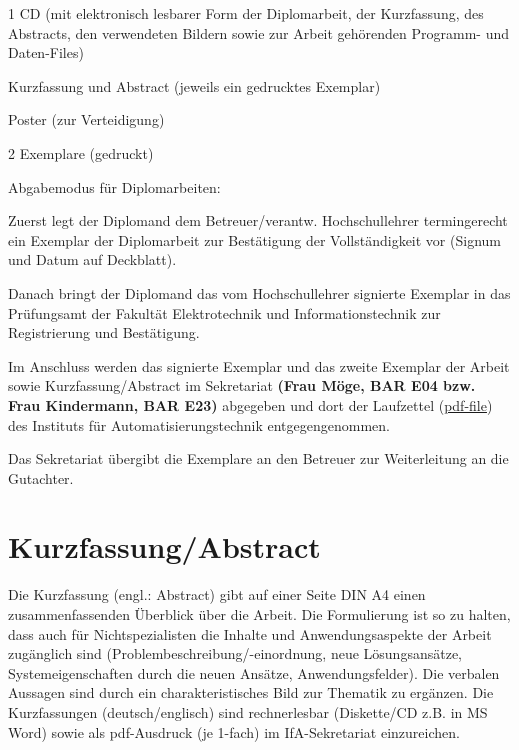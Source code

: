 \begin{compactitem}
  \item 1 CD (mit elektronisch lesbarer Form der Diplomarbeit, der Kurzfassung, des Abstracts, den verwendeten Bildern sowie zur Arbeit gehörenden Programm- und Daten-Files)
  \item Kurzfassung und Abstract (jeweils ein gedrucktes Exemplar)
  \item Poster (zur Verteidigung)
  \item 2 Exemplare (gedruckt)
  \item Abgabemodus für Diplomarbeiten:
    \begin{compactitem}
      \item Zuerst legt der Diplomand dem Betreuer/verantw. Hochschullehrer termingerecht ein Exemplar der Diplomarbeit zur Bestätigung der Vollständigkeit vor (Signum und Datum auf Deckblatt).
      \item Danach bringt der Diplomand das vom Hochschullehrer signierte Exemplar in das Prüfungsamt der Fakultät Elektrotechnik und Informationstechnik zur Registrierung und Bestätigung.
      \item Im Anschluss werden das signierte Exemplar und das zweite Exemplar der Arbeit sowie Kurzfassung/Abstract im Sekretariat {\bfseries (Frau Möge, BAR E04 bzw. Frau Kindermann, BAR E23)}  abgegeben und dort der Laufzettel (\href{http://www.et.tu-dresden.de/ifa/fileadmin/user_upload/www_files/richtlinien_sa_da/DA-SA_Laufzettel.pdf}{pdf-file}) des Instituts für Automatisierungstechnik entgegengenommen.
    \end{compactitem}
\end{compactitem}

Das Sekretariat übergibt die Exemplare an den Betreuer zur Weiterleitung an die Gutachter.


\section{Kurzfassung/Abstract}
\label{sec:KurzfassungAbstract}

Die Kurzfassung (engl.: Abstract) gibt auf einer Seite DIN A4 einen zusammenfassenden Überblick über die Arbeit. Die Formulierung ist so zu halten, dass auch für Nichtspezialisten die Inhalte und Anwendungsaspekte der Arbeit zugänglich sind (Problembeschreibung/-einordnung, neue Lösungsansätze, Systemeigenschaften durch die neuen Ansätze, Anwendungsfelder). Die verbalen Aussagen sind durch ein charakteristisches Bild zur Thematik zu ergänzen.
Die Kurzfassungen (deutsch/englisch) sind rechnerlesbar (Diskette/CD z.B. in MS Word) sowie als pdf-Ausdruck (je 1-fach) im IfA-Sekretariat einzureichen.

